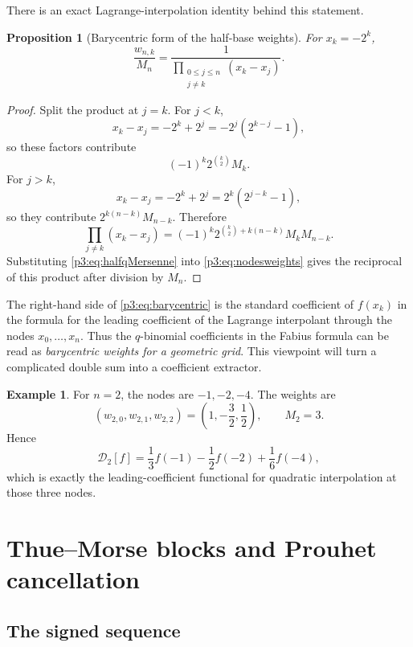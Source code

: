 \documentclass[11pt,oneside]{article}
\newtheorem{proposition}[theorem]{Proposition}
\theoremstyle{definition}
\newtheorem{example}[theorem]{Example}
\theoremstyle{remark}
\begin{document}
There is an exact Lagrange-interpolation identity behind this statement.

\begin{proposition}[Barycentric form of the half-base weights]\label{p3:prop:barycentric}
For $x_k=-2^k$,
\begin{equation}\label{p3:eq:barycentric}
 \boxed{
 \frac{w_{n,k}}{M_n}
 =\frac{1}{\displaystyle\prod_{\substack{0\le j\le n\\j\ne k}}(x_k-x_j)}.}
\end{equation}
\end{proposition}

\begin{proof}
Split the product at $j=k$.  For $j<k$,
\[
 x_k-x_j=-2^k+2^j=-2^j(2^{k-j}-1),
\]
so these factors contribute
\[
 (-1)^k2^{\binom{k}{2}}M_k.
\]
For $j>k$,
\[
 x_k-x_j=-2^k+2^j=2^k(2^{j-k}-1),
\]
so they contribute $2^{k(n-k)}M_{n-k}$.  Therefore
\[
 \prod_{j\ne k}(x_k-x_j)
 =(-1)^k2^{\binom{k}{2}+k(n-k)}M_kM_{n-k}.
\]
Substituting \eqref{p3:eq:halfqMersenne} into \eqref{p3:eq:nodesweights} gives the reciprocal of this product after division by $M_n$.
\end{proof}

The right-hand side of \eqref{p3:eq:barycentric} is the standard coefficient of $f(x_k)$ in the formula for the leading coefficient of the Lagrange interpolant through the nodes $x_0,\ldots,x_n$.  Thus the $q$-binomial coefficients in the Fabius formula can be read as \emph{barycentric weights for a geometric grid}.  This viewpoint will turn a complicated double sum into a coefficient extractor.

\begin{example}
For $n=2$, the nodes are $-1,-2,-4$.  The weights are
\[
 (w_{2,0},w_{2,1},w_{2,2})=\left(1,-\frac32,\frac12\right),
 \qquad M_2=3.
\]
Hence
\[
 \mathcal D_2[f]
 =\frac13f(-1)-\frac12f(-2)+\frac16f(-4),
\]
which is exactly the leading-coefficient functional for quadratic interpolation at those three nodes.
\end{example}

\section{Thue--Morse blocks and Prouhet cancellation}

\subsection{The signed sequence}
\end{document}
